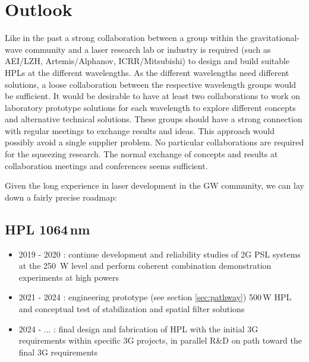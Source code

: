 \section{Outlook}
Like in the past a strong collaboration between a group within the gravitational-wave community and a laser research lab or industry is required (such as AEI/LZH, Artemis/Alphanov, ICRR/Mitsubishi) to design and build suitable HPLs at the different wavelengths. As the different wavelengths need different solutions, a loose collaboration between the respective wavelength groups would be sufficient. It would be desirable to have at least two collaborations to work on laboratory prototype solutions for each wavelength to explore different concepts and alternative technical solutions. These groups should have a strong connection with regular meetings to exchange results and ideas. This approach would possibly avoid a single supplier problem.
No particular collaborations are required for the squeezing research. The normal exchange of concepts and results at collaboration meetings and conferences seems sufficient. 

Given the long experience in laser development in the GW community, we can lay down a fairly precise roadmap: 

\subsection*{HPL 1064\,nm}
\begin{itemize}
	\item 2019 - 2020 : continue development and reliability studies of 2G PSL systems at the 250\, W level and perform coherent combination demonstration experiments at high powers
	\item 2021 - 2024 : engineering prototype (see section \ref{sec:pathway}) 500\,W HPL and conceptual test of stabilization and spatial filter solutions
	\item 2024 - ... : final design and fabrication of HPL with the initial 3G requirements within specific 3G projects, in parallel R\&D on path toward the final 3G requirements 
\end{itemize} 


